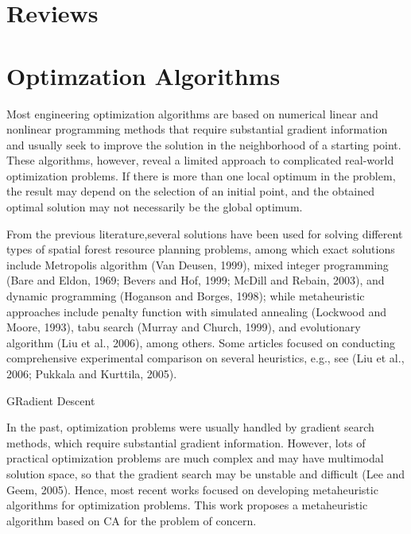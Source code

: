 \documentclass[12pt]{caltech_thesis}
\begin{document}
\section{Reviews}
\begin{bibunit}
\citep{Tong2012}

\citep{Cao2019}

\section{Optimzation Algorithms}
Most engineering optimization algorithms are based on numerical linear and nonlinear programming methods that require substantial gradient information and usually seek to improve the solution in the neighborhood of a starting point. These algorithms, however, reveal a limited approach to complicated real-world optimization problems. If there is more than one local optimum in the problem, the result may depend on the selection of an initial point, and the obtained optimal solution may not necessarily be the global optimum. \citep{lee2005new}



From the previous literature,several solutions have been used for solving different types of spatial forest resource planning problems, among which exact solutions
include Metropolis algorithm (Van Deusen, 1999), mixed
integer programming (Bare and Eldon, 1969; Bevers and Hof, 1999;
McDill and Rebain, 2003), and dynamic programming (Hoganson
and Borges, 1998); while metaheuristic approaches include penalty
function with simulated annealing (Lockwood and Moore,
1993), tabu search (Murray and Church, 1999), and evolutionary
algorithm (Liu et al., 2006), among others. Some articles focused on
conducting comprehensive experimental comparison on several
heuristics, e.g., see (Liu et al., 2006; Pukkala and Kurttila, 2005).


GRadient Descent

In the past, optimization problems were usually handled by
gradient search methods, which require substantial gradient information.
However, lots of practical optimization problems are
much complex and may have multimodal solution space, so that
the gradient search may be unstable and difficult (Lee and Geem,
2005). Hence, most recent works focused on developing metaheuristic
algorithms for optimization problems. This work proposes
a metaheuristic algorithm based on CA for the problem of concern.





\end{bibunit}
\end{document}
